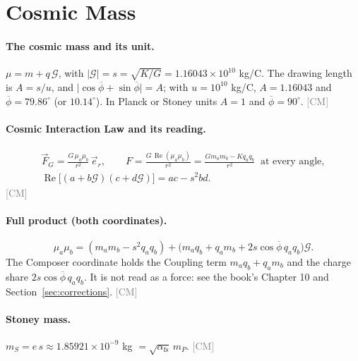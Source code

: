 \documentclass[11pt]{article}
\newcommand{\pb}{\overline{\phi}}
\newcommand{\Gp}{\mathcal{G}}
\newcommand{\G}{\lvert\Gp\rvert}
\renewcommand{\Re}{\operatorname{Re}}
\newcommand{\src}[1]{\hfill{\small\textcolor{gray}{[#1]}}}
\begin{document}
\section{Cosmic Mass}

\paragraph{The cosmic mass and its unit.}
$\mu = m + q\,\Gp$, with $\G = s = \sqrt{K/G} = 1.16043\times10^{10}$ kg/C. The drawing length is $A = s/u$, and $\lvert\cos\pb+\sin\pb\rvert = A$; with $u = 10^{10}$ kg/C, $A = 1.16043$ and $\pb = 79.86^\circ$ (or $10.14^\circ$). In Planck or Stoney units $A = 1$ and $\pb = 90^\circ$. \src{CM}

\paragraph{Cosmic Interaction Law and its reading.}
\begin{gather*}
\vec F_G = \frac{G\,\mu_a\mu_b}{r^2}\,\vec e_r,\qquad
F = \frac{G\,\Re(\mu_a\mu_b)}{r^2} = \frac{G m_am_b - K q_aq_b}{r^2}\ \text{ at every angle},\\
\Re\bigl[(a+b\Gp)(c+d\Gp)\bigr] = ac - s^2bd .
\end{gather*}\src{CM}

\paragraph{Full product (both coordinates).}
\[
\mu_a\mu_b = (m_am_b - s^2q_aq_b) + \bigl(m_aq_b + q_am_b + 2s\cos\pb\,q_aq_b\bigr)\Gp .
\]
The Composer coordinate holds the Coupling term $m_aq_b+q_am_b$ and the charge share $2s\cos\pb\,q_aq_b$.
It is not read as a force: see the book's Chapter 10 and Section~\ref{sec:corrections}. \src{CM}

\paragraph{Stoney mass.} $m_S = e\,s \approx 1.85921\times10^{-9}$ kg $=\sqrt{\alpha_{\mathrm{fs}}}\,m_P$. \src{CM}
\end{document}
